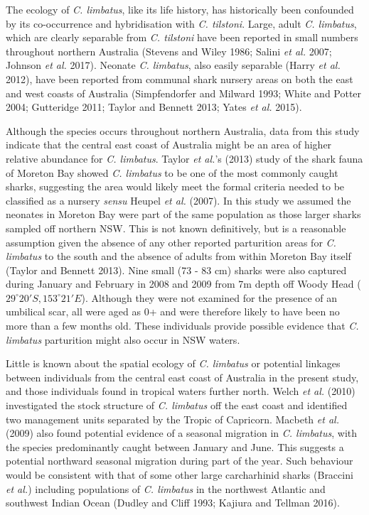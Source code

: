 \documentclass[]{article}
\begin{document}
The ecology of \emph{C. limbatus}, like its life history, has
historically been confounded by its co-occurrence and hybridisation with
\emph{C. tilstoni}. Large, adult \emph{C. limbatus}, which are clearly
separable from \emph{C. tilstoni} have been reported in small numbers
throughout northern Australia (Stevens and Wiley 1986; Salini \emph{et
al.} 2007; Johnson \emph{et al.} 2017). Neonate \emph{C. limbatus}, also
easily separable (Harry \emph{et al.} 2012), have been reported from
communal shark nursery areas on both the east and west coasts of
Australia (Simpfendorfer and Milward 1993; White and Potter 2004;
Gutteridge 2011; Taylor and Bennett 2013; Yates \emph{et al.} 2015).

Although the species occurs throughout northern Australia, data from
this study indicate that the central east coast of Australia might be an
area of higher relative abundance for \emph{C. limbatus}. Taylor
\emph{et al.}'s (2013) study of the shark fauna of Moreton Bay showed
\emph{C. limbatus} to be one of the most commonly caught sharks,
suggesting the area would likely meet the formal criteria needed to be
classified as a nursery \emph{sensu} Heupel \emph{et al.} (2007). In
this study we assumed the neonates in Moreton Bay were part of the same
population as those larger sharks sampled off northern NSW. This is not
known definitively, but is a reasonable assumption given the absence of
any other reported parturition areas for \emph{C. limbatus} to the south
and the absence of adults from within Moreton Bay itself (Taylor and
Bennett 2013). Nine small (73 - 83 cm) sharks were also captured during
January and February in 2008 and 2009 from 7m depth off Woody Head
(\(29^\circ 20'S, 153^\circ 21'E\)). Although they were not examined for
the presence of an umbilical scar, all were aged as 0+ and were
therefore likely to have been no more than a few months old. These
individuals provide possible evidence that \emph{C. limbatus}
parturition might also occur in NSW waters.

Little is known about the spatial ecology of \emph{C. limbatus} or
potential linkages between individuals from the central east coast of
Australia in the present study, and those individuals found in tropical
waters further north. Welch \emph{et al.} (2010) investigated the stock
structure of \emph{C. limbatus} off the east coast and identified two
management units separated by the Tropic of Capricorn. Macbeth \emph{et
al.} (2009) also found potential evidence of a seasonal migration in
\emph{C. limbatus}, with the species predominantly caught between
January and June. This suggests a potential northward seasonal migration
during part of the year. Such behaviour would be consistent with that of
some other large carcharhinid sharks (Braccini \emph{et al.}) including
populations of \emph{C. limbatus} in the northwest Atlantic and
southwest Indian Ocean (Dudley and Cliff 1993; Kajiura and Tellman
2016).
\end{document}
